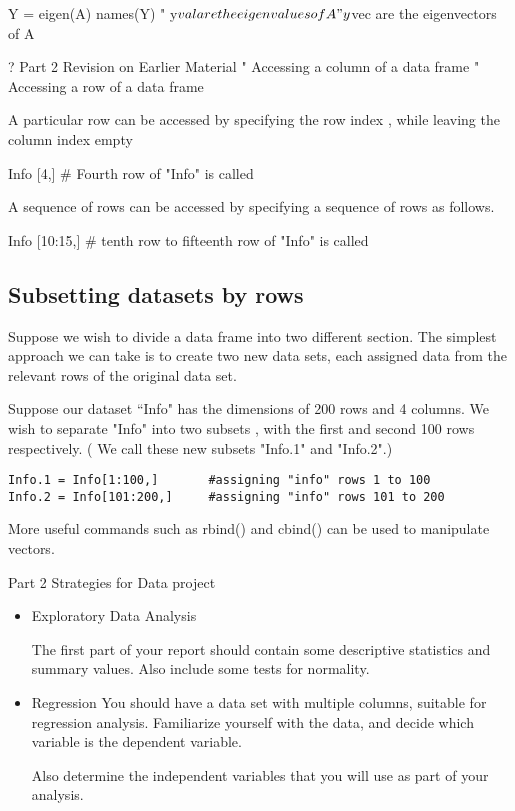 \documentclass[a4paper,12pt]{article}
\begin{document}
\begin{itemize}
Y = eigen(A)
names(Y)
"	y$val are the eigenvalues of A
"	y$vec are the eigenvectors of A

?
Part 2 Revision on Earlier Material
"	Accessing a column of a data frame
"	Accessing a row of a data frame

A particular row can be accessed by specifying the row index , while leaving the column index empty

Info [4,]			# Fourth row of "Info" is called

A sequence of rows can be accessed by specifying a sequence of rows as follows.

Info [10:15,]		# tenth row to fifteenth row of "Info" is called


\subsection{Subsetting datasets by rows}

Suppose we wish to divide a data frame into two different section. The simplest approach we can take is to create two new data sets, each assigned data from the relevant rows of the original data set.

Suppose our dataset ``Info" has the dimensions of 200 rows and 4 columns. We wish to separate "Info" into two subsets , with the first and second 100 rows respectively. ( We call these new subsets "Info.1" and "Info.2".)
\begin{verbatim}
Info.1 = Info[1:100,]		#assigning "info" rows 1 to 100
Info.2 = Info[101:200,]		#assigning "info" rows 101 to 200
\end{verbatim}

More useful commands such as rbind() and cbind()  can be used to manipulate vectors.

Part 2 Strategies for Data project
\begin{itemize}
\item Exploratory Data Analysis

The first part of your report should contain some descriptive statistics and summary values. Also include some tests for normality.

\item{Regression}
You should have a data set with multiple columns, suitable for regression analysis.
Familiarize yourself with the data, and decide which variable is the dependent variable.

Also determine the independent variables that you will use as part of your analysis.


\end{itemize}
\end{itemize}
\end{document}
